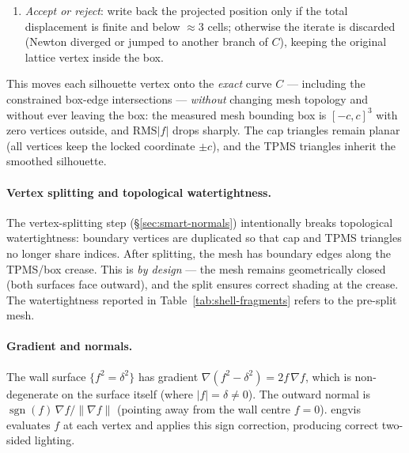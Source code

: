 \documentclass[11pt]{article}
\begin{document}
\begin{enumerate}[leftmargin=2em]
\begin{itemize}
\begin{equation}
                \end{equation}
                where $\nabla_{\!uv} f = (\partial_u f,\, \partial_v f)$
                is the finite-difference gradient on the free axes.
        \end{itemize}
        In every case the damping factor $\alpha\le 1$ caps each step
        at $\approx 2$ cells, and the free coordinate(s) are
        \textbf{clamped to $[-c, c]$} after each step so the iterate
        cannot slide along $C$ past the face/edge boundary and push
        the mesh outside the box $[-1,1]^3$.
  \item \emph{Accept or reject}: write back the projected position
        only if the total displacement is finite and below
        $\approx 3$ cells; otherwise the iterate is discarded (Newton
        diverged or jumped to another branch of $C$), keeping the
        original lattice vertex inside the box.
\end{enumerate}

This moves each silhouette vertex onto the \emph{exact} curve $C$ ---
including the constrained box-edge intersections --- \emph{without}
changing mesh topology and without ever leaving the box: the measured
mesh bounding box is $[-c,c]^3$ with zero vertices outside, and
$\mathrm{RMS}|f|$ drops sharply.  The
cap triangles remain planar (all vertices keep the locked
coordinate $\pm c$), and the TPMS triangles inherit the smoothed
silhouette.

\paragraph{Vertex splitting and topological watertightness.}
The vertex-splitting step (\S\ref{sec:smart-normals}) intentionally
breaks topological watertightness: boundary vertices are duplicated
so that cap and TPMS triangles no longer share indices.  After
splitting, the mesh has boundary edges along the TPMS/box crease.
This is \emph{by design} --- the mesh remains geometrically closed
(both surfaces face outward), and the split ensures correct shading
at the crease.  The watertightness reported in
Table~\ref{tab:shell-fragments} refers to the pre-split mesh.

\paragraph{Gradient and normals.}
The wall surface $\{f^2=\delta^2\}$ has gradient
$\nabla(f^2-\delta^2) = 2f\,\nabla f$, which is non-degenerate on the
surface itself (where $|f|=\delta\neq 0$).  The outward normal is
$\operatorname{sgn}(f)\,\nabla f / \|\nabla f\|$ (pointing away from
the wall centre $f=0$).  engvis evaluates $f$ at each vertex and
applies this sign correction, producing correct two-sided lighting.
\end{document}
